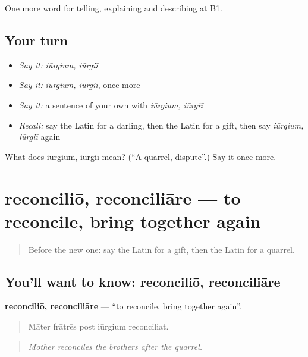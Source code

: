 \begin{grammarlens}[title={What you've built}]
One more word for telling, explaining and describing at B1.
\end{grammarlens}

\subsection*{Your turn}
\begin{itemize}
\raggedright
  \item \emph{Say it:} \emph{iūrgium, iūrgiī}
  \item \emph{Say it:} \emph{iūrgium, iūrgiī}, once more
  \item \emph{Say it:} a sentence of your own with \emph{iūrgium, iūrgiī}
  \item \emph{Recall:} say the Latin for a darling, then the Latin for a gift, then say \emph{iūrgium, iūrgiī} again
\end{itemize}

\begin{tcolorbox}[breakable,colback=teal!4,colframe=teal!35!black,title={Before you move on}]
What does iūrgium, iūrgiī mean? (\textquotedblleft{}A quarrel, dispute\textquotedblright{}.) Say it once more.
\end{tcolorbox}
\section[reconciliō, reconciliāre]{reconciliō, reconciliāre — to reconcile, bring together again}

\label{lesson:LA-C537-reconcilio}



\begin{quote}
Before the new one: say the Latin for a gift, then the Latin for a quarrel.
\end{quote}

\subsection*{You'll want to know: reconciliō, reconciliāre}
\textbf{reconciliō, reconciliāre} — \textquotedblleft{}to reconcile, bring together again\textquotedblright{}.

\begin{quote}
Māter frātrēs post iūrgium reconciliat.
\end{quote}

\begin{quote}
\emph{Mother reconciles the brothers after the quarrel.}
\end{quote}

